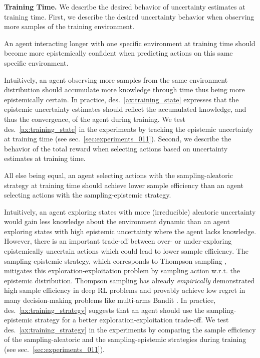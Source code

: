 \textbf{Training Time.} We describe the desired behavior of uncertainty estimates at training time. First, we describe the desired uncertainty behavior when observing more samples of the training environment.
\begin{desiderata}
    \label{ax:training_state}
    An agent interacting longer with one specific environment at training time should become more epistemically confident when predicting actions on this same specific environment.
\end{desiderata}
\vspace{-2mm}
Intuitively, an agent observing more samples from the same environment distribution should accumulate more knowledge through time thus being more epistemically certain. In practice, des.~\ref{ax:training_state} expresses that the epistemic uncertainty estimates should reflect the accumulated knowledge, and thus the convergence, of the agent during training. We test des.~\ref{ax:training_state} in the experiments by tracking the epistemic uncertainty at training time (see sec.~\ref{sec:experiments_011}). Second, we describe the behavior of the total reward when selecting actions based on uncertainty estimates at training time.
\begin{desiderata}
    \label{ax:training_strategy}
    All else being equal, an agent selecting actions with the sampling-aleatoric strategy at training time should achieve lower sample efficiency than an agent selecting actions with the sampling-epistemic strategy.
\end{desiderata}
Intuitively, an agent exploring states with more (irreducible) aleatoric uncertainty would gain less knowledge about the environment dynamic than an agent exploring states with high epistemic uncertainty where the agent lacks knowledge. However, there is an important trade-off between over- or under-exploring epistemically uncertain actions which could lead to lower sample efficiency. The sampling-epistemic strategy, which corresponds to Thompson sampling \cite{thompson-sampling}, mitigates this exploration-exploitation problem by sampling action w.r.t. the epistemic distribution. Thompson sampling has already \emph{empirically} demonstrated high sample efficiency in deep RL problems \cite{dropout} and provably achieve low regret in many decision-making problems like multi-arms Bandit \cite{thompson-sampling-mab, thompson-sampling-information}. In practice, des.~\ref{ax:training_strategy} suggests that an agent should use the sampling-epistemic strategy for a better exploration-exploitation trade-off. We test des.~\ref{ax:training_strategy} in the experiments by comparing the sample efficiency of the sampling-aleatoric and the sampling-epistemic strategies during training (see sec.~\ref{sec:experiments_011}).

